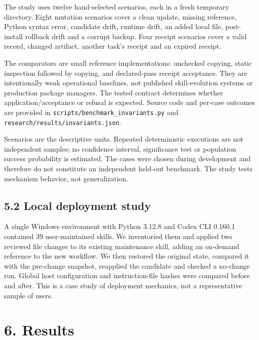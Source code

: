 \documentclass[
  11pt,
]{article}
\begin{document}
The study uses twelve hand-selected scenarios, each in a fresh temporary
directory. Eight mutation scenarios cover a clean update, missing
reference, Python syntax error, candidate drift, runtime drift, an added
local file, post-install rollback drift and a corrupt backup. Four
receipt scenarios cover a valid record, changed artifact, another task's
receipt and an expired receipt.

The comparators are small reference implementations: unchecked copying,
static inspection followed by copying, and declared-pass receipt
acceptance. They are intentionally weak operational baselines, not
published skill-evolution systems or production package managers. The
tested contract determines whether application/acceptance or refusal is
expected. Source code and per-case outcomes are provided in
\texttt{scripts/benchmark\_invariants.py} and
\texttt{research/results/invariants.json}.

Scenarios are the descriptive units. Repeated deterministic executions
are not independent samples; no confidence interval, significance test
or population success probability is estimated. The cases were chosen
during development and therefore do not constitute an independent
held-out benchmark. The study tests mechanism behavior, not
generalization.

\subsection{5.2 Local deployment study}\label{local-deployment-study}

A single Windows environment with Python 3.12.8 and Codex CLI 0.160.1
contained 39 user-maintained skills. We inventoried them and applied two
reviewed file changes to its existing maintenance skill, adding an
on-demand reference to the new workflow. We then restored the original
state, compared it with the pre-change snapshot, reapplied the candidate
and checked a no-change run. Global host configuration and
instruction-file hashes were compared before and after. This is a case
study of deployment mechanics, not a representative sample of users.

\section{6. Results}\label{results}
\end{document}
